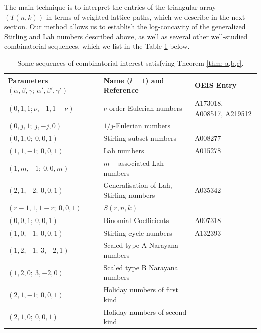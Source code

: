 \documentclass{article}
\theoremstyle{definition}
\numberwithin{equation}{section}
\begin{document}
The main technique is to interpret the entries of the triangular array $(T(n,k))$ in terms of weighted lattice paths, which we describe in the next section.
Our method allows us to establish the log-concavity of the generalized Stirling and Lah numbers described above, as well as several other well-studied combinatorial sequences, which we list in the Table \ref{tab:parameters} below.

\begin{table}[ht]
\centering
\begin{tabular}{|l|l|l|}
\hline
\textbf{Parameters $(\alpha,\beta,\gamma;\  \alpha',\beta',\gamma')$} & \textbf{Name ($l=1$) and Reference} & \textbf{OEIS Entry} \\
\hline
$(0,1,1;\nu,-1,1-\nu)$ & $\nu$-order Eulerian numbers \cite{higher-order-eulerian} & A173018, A008517, A219512 \\
$(0,j,1;\ j,-j,0)$ & $1/j$-Eulerian numbers \cite{1/k-eulerian} & \\
$(0,1,0;\ 0,0,1)$ & Stirling subset numbers & A008277\\
$(1,1,-1;\ 0,0,1)$ & Lah numbers & A015278\\
$(1,m,-1;\ 0,0,m)$ & $m-$associated Lah numbers&\\
$(2,1,-2;\ 0,0,1)$ & Generalisation of Lah, Stirling numbers  \cite{stirling-lah} & A035342\\
$(r-1,1,1-r;\ 0,0,1)$ & $S(r,n,k)$ \cite{broder-r-stir}& \\
$(0,0,1;\ 0,0,1)$ & Binomial Coefficients & A007318\\
$(1,0,-1;\ 0,0,1)$ & Stirling cycle numbers & A132393\\
$(1,2,-1;\ 3,-2,1)$ & Scaled type A Narayana numbers \cite{ma-gamma-descent} & \\
$(1,2,0;\ 3,-2,0)$ & Scaled type B Narayana numbers \cite{ma-gamma-descent}& \\
$(2,1,-1;\ 0,0,1)$ & Holiday numbers of first kind \cite{Szekely-holiday}&\\
$(2,1,0;\ 0,0,1)$& Holiday numbers of second kind\cite{Szekely-holiday} & \\
\hline
\end{tabular}
\caption{Some sequences of combinatorial interest satisfying Theorem \ref{thm: a,b,c}.}
\label{tab:parameters}
\end{table}
\end{document}
